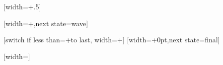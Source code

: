 \def\pgfpoint@oncoil#1#2#3{%
  \pgf@x=#1\pgfsnakesegmentamplitude%
  \pgf@x=\pgfsnakesegmentaspect\pgf@x%
  \pgf@y=#2\pgfsnakesegmentamplitude%
  \pgf@xa=0.083333333333\pgfsnakesegmentlength%
  \advance\pgf@x by#3\pgf@xa%
}


%

{
  [width=+.5\pgfsnakesegmentlength]
  {
    \pgfpathcurveto
    {\pgfqpoint{0pt}{.555\pgfsnakesegmentamplitude}}
    {\pgfqpoint{0.11125\pgfsnakesegmentlength}{\pgfsnakesegmentamplitude}}
    {\pgfqpoint{.25\pgfsnakesegmentlength}{\pgfsnakesegmentamplitude}}
    \pgfpathcurveto
    {\pgfqpoint{.38875\pgfsnakesegmentlength}{\pgfsnakesegmentamplitude}}
    {\pgfqpoint{.5\pgfsnakesegmentlength}{.5\pgfsnakesegmentamplitude}}
    {\pgfqpoint{.5\pgfsnakesegmentlength}{0\pgfsnakesegmentamplitude}}
  }
  {
    \pgfpathlineto{\pgfqpoint{\pgfsnakeremainingdistance}{0pt}}
  }
}



%

{
  [width=+\pgfsnakesegmentlength,next state=wave]
  {}

  [switch if less than=+\pgfsnakesegmentlength to last,
               width=+\pgfsnakesegmentlength]
  {
    \pgfpathmoveto{
      \pgfpointadd
      {\pgfqpoint{-\pgfsnakecompleteddistance}{0pt}}%
      {\pgfpointpolar{\pgfsnakesegmentangle}{+\pgfsnakecompleteddistance}}}%
    \pgfpatharc{\pgfsnakesegmentangle}{-\pgfsnakesegmentangle}{+\pgfsnakecompleteddistance}%
  }
  [width=+0pt,next state=final]
  {
    \pgfpathmoveto{
      \pgfpointadd
      {\pgfqpoint{-\pgfsnakecompleteddistance}{0pt}}%
      {\pgfpointpolar{\pgfsnakesegmentangle}{+\pgfsnakecompleteddistance}}}%
    \pgfpatharc{\pgfsnakesegmentangle}{-\pgfsnakesegmentangle}{+\pgfsnakecompleteddistance}%
  }
  {
    \pgfpathmoveto{\pgfqpoint{\pgfsnakeremainingdistance}{0pt}}
  }
}



%

{
  [width=\pgfsnakesegmentlength]
  {
    \pgftransformxshift{+\pgfsnakesegmentlength}
    \pgfpathmoveto{
      \pgfpointadd
      {\pgfqpoint{-\pgfsnakesegmentobjectlength}{0pt}}%
      {\pgfpointpolar{\pgfsnakesegmentangle}{+\pgfsnakesegmentobjectlength}}}%
    \pgfpatharc{\pgfsnakesegmentangle}{-\pgfsnakesegmentangle}{+\pgfsnakesegmentobjectlength}%
  }
  {
    \pgfpathmoveto{\pgfqpoint{\pgfsnakeremainingdistance}{0pt}}
  }
}


